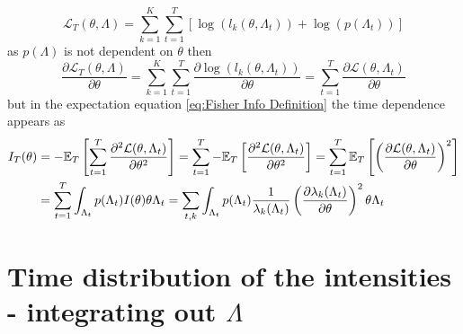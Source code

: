 \begin{equation}
	\mathcal{L}_T(\theta,\Lambda)=\sum_{k=1}^K\sum_{t=1}^T\left[\log\left(l_k(\theta,\Lambda_t)\right)+\log\left(p(\Lambda_t)\right)\right]
\end{equation}
%
as $p(\Lambda)$ is not dependent on $\theta$ then
%
\begin{equation}
	\frac{\partial\mathcal{L}_T(\theta,\Lambda)}{\partial \theta}=\sum_{k=1}^K\sum_{t=1}^T\frac{\partial\log\left(l_k(\theta,\Lambda_t)\right)}{\partial \theta}=\sum_{t=1}^T\frac{\partial\mathcal{L}(\theta,\Lambda_t)}{\partial \theta}
\end{equation}
%
but in the expectation equation \autoref{eq:Fisher Info Definition} the time dependence appears as
%
\begin{alignat*}{1}
	I_T(\theta) & =-\mathbb{E}_T\left[\sum_{t=1}^T\frac{\partial^2\mathcal{L}(\theta,\Lambda_t)}{\partial \theta^2}\right]=\sum_{t=1}^T-\mathbb{E}_T\left[\frac{\partial^2\mathcal{L}(\theta,\Lambda_t)}{\partial \theta^2}\right]=\sum_{t=1}^T\mathbb{E}_T\left[\left(\frac{\partial\mathcal{L}(\theta,\Lambda_t)}{\partial \theta}\right)^2\right]\\
	& =\sum_{t=1}^T\int_{\Lambda_t}p(\Lambda_t)I(\theta)\theta\Lambda_t=\sum_{t,k}\int_{\Lambda_t}p(\Lambda_t)\frac{1}{\lambda_k(\Lambda_t)}\left(\frac{\partial\lambda_k(\Lambda_t)}{\partial \theta}\right)^2\theta\Lambda_t
\end{alignat*}


\section{Time distribution of the intensities - integrating out $\Lambda$}
\label{sub:Appendix Time-distribution-Integrating out}

